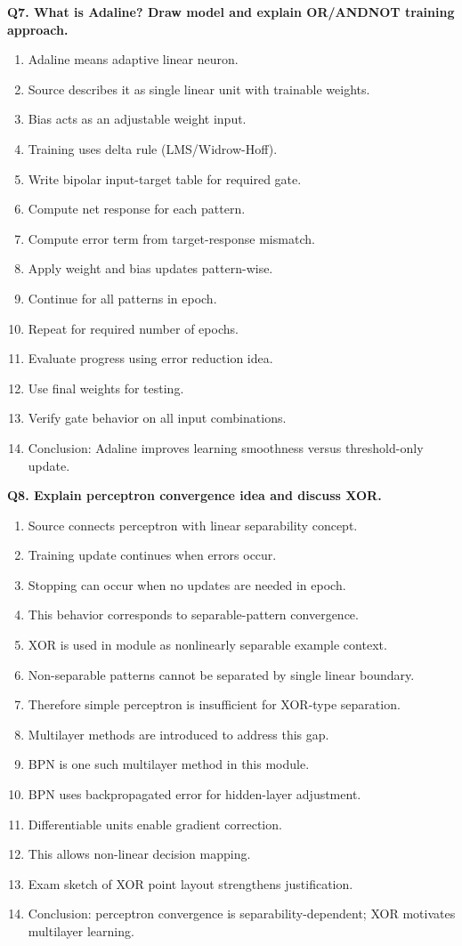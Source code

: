 \documentclass[11pt,a4paper]{article}
\begin{document}
\textbf{Q7. What is Adaline? Draw model and explain OR/ANDNOT training approach.}
\begin{enumerate}
\item Adaline means adaptive linear neuron.
\item Source describes it as single linear unit with trainable weights.
\item Bias acts as an adjustable weight input.
\item Training uses delta rule (LMS/Widrow-Hoff).
\item Write bipolar input-target table for required gate.
\item Compute net response for each pattern.
\item Compute error term from target-response mismatch.
\item Apply weight and bias updates pattern-wise.
\item Continue for all patterns in epoch.
\item Repeat for required number of epochs.
\item Evaluate progress using error reduction idea.
\item Use final weights for testing.
\item Verify gate behavior on all input combinations.
\item Conclusion: Adaline improves learning smoothness versus threshold-only update.
\end{enumerate}

\textbf{Q8. Explain perceptron convergence idea and discuss XOR.}
\begin{enumerate}
\item Source connects perceptron with linear separability concept.
\item Training update continues when errors occur.
\item Stopping can occur when no updates are needed in epoch.
\item This behavior corresponds to separable-pattern convergence.
\item XOR is used in module as nonlinearly separable example context.
\item Non-separable patterns cannot be separated by single linear boundary.
\item Therefore simple perceptron is insufficient for XOR-type separation.
\item Multilayer methods are introduced to address this gap.
\item BPN is one such multilayer method in this module.
\item BPN uses backpropagated error for hidden-layer adjustment.
\item Differentiable units enable gradient correction.
\item This allows non-linear decision mapping.
\item Exam sketch of XOR point layout strengthens justification.
\item Conclusion: perceptron convergence is separability-dependent; XOR motivates multilayer learning.
\end{enumerate}
\end{document}
